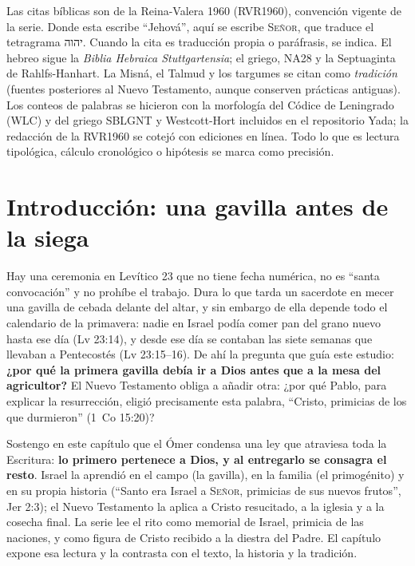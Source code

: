 \documentclass[11pt,letterpaper]{article}
\newcommand{\heb}[1]{\mbox{\foreignlanguage{hebrew}{#1}}}
\newcommand{\SENOR}{\textsc{Señor}}
\newcommand{\destacar}[1]{\textbf{\textcolor{tierraroja}{#1}}}
\begin{document}
\begin{nota}
Las citas bíblicas son de la Reina-Valera 1960 (RVR1960), convención vigente de la serie. Donde esta escribe ``Jehová'', aquí se escribe \SENOR, que traduce el tetragrama \heb{יהוה}. Cuando la cita es traducción propia o paráfrasis, se indica. El hebreo sigue la \emph{Biblia Hebraica Stuttgartensia}; el griego, NA28 y la Septuaginta de Rahlfs-Hanhart. La Misná, el Talmud y los targumes se citan como \emph{tradición} (fuentes posteriores al Nuevo Testamento, aunque conserven prácticas antiguas). Los conteos de palabras se hicieron con la morfología del Códice de Leningrado (WLC) y del griego SBLGNT y Westcott-Hort incluidos en el repositorio Yada; la redacción de la RVR1960 se cotejó con ediciones en línea. Todo lo que es lectura tipológica, cálculo cronológico o hipótesis se marca como precisión.
\end{nota}

\section{Introducción: una gavilla antes de la siega}

Hay una ceremonia en Levítico 23 que no tiene fecha numérica, no es ``santa convocación'' y no prohíbe el trabajo. Dura lo que tarda un sacerdote en mecer una gavilla de cebada delante del altar, y sin embargo de ella depende todo el calendario de la primavera: nadie en Israel podía comer pan del grano nuevo hasta ese día (Lv 23:14), y desde ese día se contaban las siete semanas que llevaban a Pentecostés (Lv 23:15--16). De ahí la pregunta que guía este estudio: \destacar{¿por qué la primera gavilla debía ir a Dios antes que a la mesa del agricultor?} El Nuevo Testamento obliga a añadir otra: ¿por qué Pablo, para explicar la resurrección, eligió precisamente esta palabra, ``Cristo, primicias de los que durmieron'' (1~Co 15:20)?

Sostengo en este capítulo que el Ómer condensa una ley que atraviesa toda la Escritura: \destacar{lo primero pertenece a Dios, y al entregarlo se consagra el resto}. Israel la aprendió en el campo (la gavilla), en la familia (el primogénito) y en su propia historia (``Santo era Israel a \SENOR, primicias de sus nuevos frutos'', Jer 2:3); el Nuevo Testamento la aplica a Cristo resucitado, a la iglesia y a la cosecha final. La serie lee el rito como memorial de Israel, primicia de las naciones, y como figura de Cristo recibido a la diestra del Padre. El capítulo expone esa lectura y la contrasta con el texto, la historia y la tradición.
\end{document}
